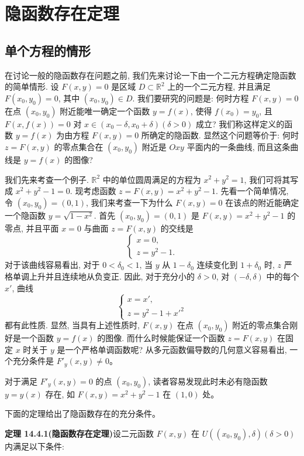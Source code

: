 \documentclass[UTF8,12pt,a4paper,fontset=fandol]{ctexart}
\begin{document}
\section{隐函数存在定理}

\subsection{单个方程的情形}

在讨论一般的隐函数存在问题之前, 我们先来讨论一下由一个二元方程确定隐函数的简单情形. 设 $F(x,y)=0$ 是区域 $D\subset\mathbb R^2$ 上的一个二元方程, 并且满足 $F(x_0,y_0)=0$, 其中 $(x_0,y_0)\in D$. 我们要研究的问题是: 何时方程 $F(x,y)=0$ 在点 $(x_0,y_0)$ 附近能唯一确定一个函数 $y=f(x)$, 使得 $f(x_0)=y_0$, 且 $F(x,f(x))=0$ 对 $x\in(x_0-\delta,x_0+\delta)(\delta>0)$ 成立? 我们称这样定义的函数 $y=f(x)$ 为由方程 $F(x,y)=0$ 所确定的隐函数. 显然这个问题等价于: 何时 $z=F(x,y)$ 的零点集合在 $(x_0,y_0)$ 附近是 $Oxy$ 平面内的一条曲线, 而且这条曲线是 $y=f(x)$ 的图像?

我们先来考查一个例子. $\mathbb R^2$ 中的单位圆周满足的方程为 $x^2+y^2=1$, 我们可将其写成 $x^2+y^2-1=0$. 现考虑函数 $z=F(x,y)=x^2+y^2-1$. 先看一个简单情况, 令 $(x_0,y_0)=(0,1)$, 我们来考查一下为什么 $F(x,y)=0$ 在该点的附近能确定一个隐函数 $y=\sqrt{1-x^2}$. 首先 $(x_0,y_0)=(0,1)$ 是 $F(x,y)=x^2+y^2-1$ 的零点, 并且平面 $x=0$ 与曲面 $z=F(x,y)$ 的交线是
\[
  \begin{cases}
    x=0,\\
    z=y^2-1.
  \end{cases}
\]
对于该曲线容易看出, 对于 $0<\delta_0<1$, 当 $y$ 从 $1-\delta_0$ 连续变化到 $1+\delta_0$ 时, $z$ 严格单调上升并且连续地从负变正. 因此, 对于充分小的 $\delta>0$, 对 $(-\delta,\delta)$ 中的每个 $x'$, 曲线
\[
  \begin{cases}
    x=x',\\
    z=y^2-1+x'^2
  \end{cases}
\]
都有此性质. 显然, 当具有上述性质时, $F(x,y)$ 在点 $(x_0,y_0)$ 附近的零点集合刚好是一个函数 $y=f(x)$ 的图像. 而什么时候能保证一个函数 $z=F(x,y)$ 在固定 $x$ 时关于 $y$ 是一个严格单调函数呢? 从多元函数偏导数的几何意义容易看出, 一个充分条件是 $F'_y(x,y)\ne0$。

对于满足 $F'_y(x,y)=0$ 的点 $(x_0,y_0)$, 读者容易发现此时未必有隐函数 $y=y(x)$ 存在, 如 $F(x,y)=x^2+y^2-1$ 在 $(1,0)$ 处。

下面的定理给出了隐函数存在的充分条件。

\noindent\textbf{定理 14.4.1(隐函数存在定理)}\quad 设二元函数 $F(x,y)$ 在 $U((x_0,y_0),\delta)(\delta>0)$ 内满足以下条件:
\end{document}
